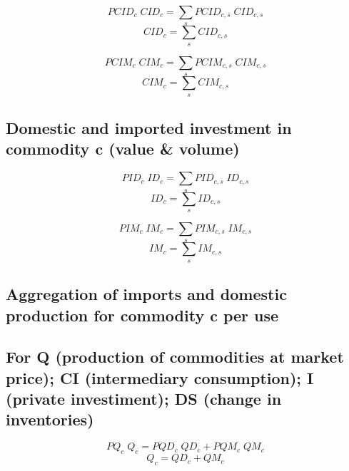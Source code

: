 \documentclass[12pt]{article}
\numberwithin{equation}{section}
\begin{document}
\begin{dmath}
PCID_{c} \; CID_{c} = \sum_{s} PCID_{c, s} \; CID_{c, s}
\end{dmath}
\begin{dmath}
CID_{c} = \sum_{s} CID_{c, s}
\end{dmath}

\begin{dmath}
PCIM_{c} \; CIM_{c} = \sum_{s} PCIM_{c, s} \; CIM_{c, s}
\end{dmath}
\begin{dmath}
CIM_{c} = \sum_{s} CIM_{c, s}
\end{dmath}



\subsection{Domestic and imported investment in commodity c (value \& volume)}



\begin{dmath}
PID_{c} \; ID_{c} = \sum_{s} PID_{c, s} \; ID_{c, s}
\end{dmath}
\begin{dmath}
ID_{c} = \sum_{s} ID_{c, s}
\end{dmath}

\begin{dmath}
PIM_{c} \; IM_{c} = \sum_{s} PIM_{c, s} \; IM_{c, s}
\end{dmath}
\begin{dmath}
IM_{c} = \sum_{s} IM_{c, s}
\end{dmath}



\subsection{Aggregation of imports and domestic production for commodity c per use}




\subsection{For Q (production of commodities at market price); CI (intermediary consumption); I (private investiment); DS (change in inventories)}



\begin{dmath}
PQ_{c} \; Q_{c} = PQD_{c} \; QD_{c} + PQM_{c} \; QM_{c}
\end{dmath}
\begin{dmath}
Q_{c} = QD_{c} + QM_{c}
\end{dmath}
\end{document}
